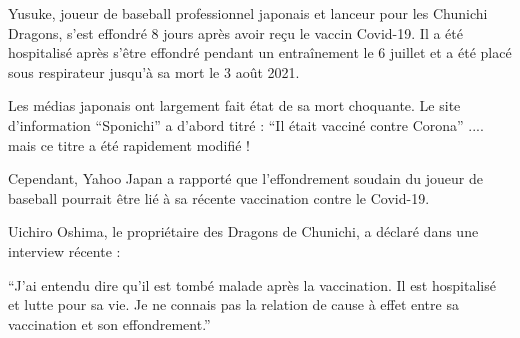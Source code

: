 Yusuke, joueur de baseball professionnel japonais et lanceur pour les Chunichi
Dragons, s'est effondré 8 jours après avoir reçu le vaccin Covid-19. Il a été
hospitalisé après s'être effondré pendant un entraînement le 6 juillet et a été
placé sous respirateur jusqu'à sa mort le 3 août 2021.

Les médias japonais ont largement fait état de sa mort choquante. Le site
d'information ``Sponichi'' a d'abord titré : ``Il était vacciné contre Corona''
.... mais ce titre a été rapidement modifié !

Cependant, Yahoo Japan a rapporté que l'effondrement soudain du joueur de
baseball pourrait être lié à sa récente vaccination contre le Covid-19.

Uichiro Oshima, le propriétaire des Dragons de Chunichi, a déclaré dans une
interview récente :

``J'ai entendu dire qu'il est tombé malade après la vaccination. Il est
hospitalisé et lutte pour sa vie. Je ne connais pas la relation de cause à effet
entre sa vaccination et son effondrement.''
